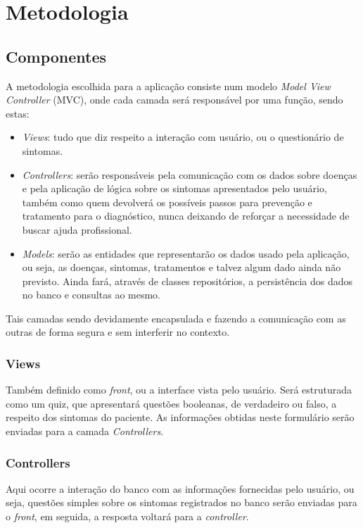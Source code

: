 \section{Metodologia}

\subsection{Componentes}

A metodologia escolhida para a aplicação consiste num modelo \emph{Model View Controller} (MVC), onde cada camada será responsável por uma função, sendo estas:
\begin{itemize}
    \item \emph{Views}: tudo que diz respeito a interação com usuário, ou o questionário de sintomas.
    \item \emph{Controllers}: serão responsáveis pela comunicação com os dados sobre doenças e pela aplicação de lógica sobre os sintomas apresentados pelo usuário, também como quem devolverá os possíveis passos para prevenção e tratamento para o diagnóstico, nunca deixando de reforçar a necessidade de buscar ajuda profissional.
    \item \emph{Models}: serão as entidades que representarão os dados usado pela aplicação, ou seja, as doenças, sintomas, tratamentos e talvez algum dado ainda não previsto. Ainda fará, através de classes repositórios, a persistência dos dados no banco e consultas ao mesmo.
\end{itemize}

Tais camadas sendo devidamente encapsulada e fazendo a comunicação com as outras de forma segura e sem interferir no contexto.

\subsubsection{Views}

Também definido como \emph{front}, ou a interface vista pelo usuário. Será estruturada como um quiz, que apresentará questões booleanas, de verdadeiro ou falso, a respeito dos sintomas do paciente.
As informações obtidas neste formulário serão enviadas para a camada \emph{Controllers}.

\subsubsection{Controllers}

Aqui ocorre a interação do banco com as informações fornecidas pelo usuário, ou seja, questões simples sobre os sintomas registrados no banco serão enviadas para o \emph{front}, em seguida, a resposta voltará para a \emph{controller}.

